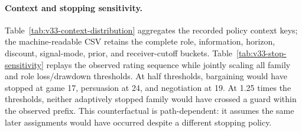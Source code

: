 \paragraph{Context and stopping sensitivity.}
Table~\ref{tab:v33-context-distribution} aggregates the recorded policy context
keys; the machine-readable CSV retains the complete role, information, horizon,
discount, signal-mode, prior, and receiver-cutoff buckets. Table~\ref{tab:v33-stop-sensitivity}
replays the observed rating sequence while jointly scaling all family and role
loss/drawdown thresholds. At half thresholds, bargaining would have stopped at
game 17, persuasion at 24, and negotiation at 19. At 1.25 times the thresholds,
neither adaptively stopped family would have crossed a guard within the observed
prefix. This counterfactual is path-dependent: it assumes the same later
assignments would have occurred despite a different stopping policy.


